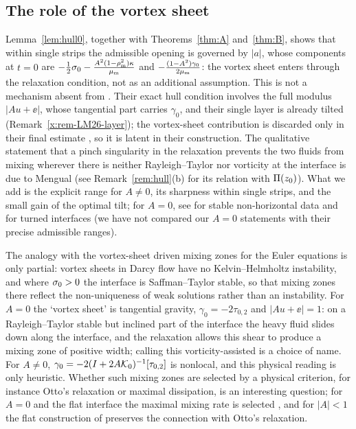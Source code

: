 \subsection{The role of the vortex sheet}
Lemma~\ref{lem:hull0}, together with Theorems~\ref{thm:A} and~\ref{thm:B}, shows that within single strips the admissible opening is governed by $|a|$, whose components at $t=0$ are
$-\frac12\sigma_0-\frac{A^2(1-\rho_{\mathrm m}^2)\kappa}{\mu_{\mathrm m}}$ and $-\frac{(1-A^2)\gamma_0}{2\mu_{\mathrm m}}$: the vortex sheet enters through the relaxation condition, not as an additional assumption. This is not a
mechanism absent from \cite{LM26}. Their exact hull condition \cite[(4.14)]{LM26} involves the full modulus $|Au+\ee|$, whose tangential part carries $\gamma_0$, and their single layer is already
tilted (Remark~\ref{x:rem-LM26-layer}); the vortex-sheet contribution is discarded only in their final estimate \cite[Sec.~7.4]{LM26}, so it is latent in their construction. The qualitative
statement that a pinch singularity in the relaxation prevents the two fluids from mixing wherever there is neither Rayleigh--Taylor nor vorticity at the interface is due to Mengual \cite{Men22}
(see Remark~\ref{rem:hull}(b) for its relation with $\Pi(z_0)$). What we add is the explicit range for $A\ne0$, its sharpness within single strips, and the small gain of the optimal tilt; for
$A=0$, see \cite{FS18} for stable non-horizontal data and \cite{CFM22} for turned interfaces (we have not compared our $A=0$ statements with their precise admissible ranges).

The analogy with the vortex-sheet driven mixing zones for the Euler equations \cite{MS23} is only partial: vortex sheets in Darcy flow have no Kelvin--Helmholtz instability, and where $\sigma_0>0$
the interface is Saffman--Taylor stable, so that mixing zones there reflect the non-uniqueness of weak solutions rather than an instability. For $A=0$ the `vortex sheet' is tangential gravity,
$\gamma_0=-2\tau_{0,2}$ and $|Au+\ee|=1$: on a Rayleigh--Taylor stable but inclined part of the interface the heavy fluid slides down along the interface, and the relaxation allows this shear to
produce a mixing zone of positive width; calling this vorticity-assisted is a choice of name. For $A\ne0$, $\gamma_0=-2(I+2A\mathcal{K}_0)^{-1}[\tau_{0,2}]$ is nonlocal, and this physical reading is only
heuristic. Whether such mixing zones are selected by a physical criterion, for instance Otto's relaxation \cite{Ott99} or maximal dissipation, is an interesting question; for $A=0$ and the flat
interface the maximal mixing rate is selected \cite{Ott99,Sze12}, and for $|A|<1$ the flat construction of \cite{Men22} preserves the connection with Otto's relaxation.

